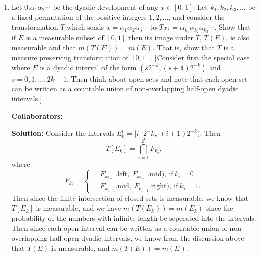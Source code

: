 \documentclass{article}%
\begin{document}
\begin{enumerate}
\item  Let $0.\alpha_1 \alpha_2 \cdots$ be the dyadic development of any $x\in[0,1]$. Let $k_1,k_2,k_3,\ldots$ be a fixed permutation of the positive integers $1,2,\ldots$, and consider the transformation $T$ which sends $x = \alpha_1\alpha_2\alpha_3\cdots$ to $Tx: = \alpha_{k_1}\alpha_{k_2}\alpha_{k_3}\cdots$. Show that if $E$ is a measurable subset of $[0,1]$ then its image under $T$, $T(E)$, is also measurable and that $m(T(E))= m(E)$.  That is, show that $T$ is a measure preserving transformation of $[0,1]$. [Consider first the special case where $E$ is a dyadic interval of the form $(s2^{-k}, (s+1)2^{-k})$ and $s = 0,1,\ldots, 2k-1$.  Then think about open sets and note that each open set can be written as a countable union of non-overlapping half-open dyadic intervals.]

\bigskip
\textbf{Collaborators:}\\
\smallskip
 
\textbf{Solution:}
Consider the intervals $E_k^i = [i\cdot2^-{k}, ~(i+1)2^{-k})$. Then
$$
T[E_k] = \bigcap_{i=1}^{2^k}F_{k_i},
$$
where 
$$
F_{k_i} = \left\{
\begin{aligned}
&[F_{k_{i-1}}.\text{left}, ~F_{k_{i-1}}.\text{mid}), ~\text{if}~ k_i = 0 \\
&[F_{k_{i-1}}.\text{mid}, ~F_{k_{i-1}}.\text{right}), ~\text{if}~ k_i = 1.
\end{aligned}
\right.
$$
Then since the finite intersection of closed sets is measurable, we know that $T[E_k]$ is measurable, and we have $m(T(E_k)) = m(E_k)$ since the probability of the numbers with infinite length be seperated into the intervals. Then since each open interval can be written as a countable union of non-overlapping half-open dyadic intervals, we know from the discussion above that $T(E)$ is measurable, and $m(T(E)) = m(E)$.

\bigskip


\end{enumerate}
\end{document}
